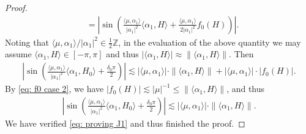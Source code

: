 \documentclass{amsart}
\numberwithin{equation}{section}
\numberwithin{equation}{section}
\begin{document}
\begin{proof}
\begin{align*}
    &=\left|\sin\left(\frac{\langle\mu,\alpha_1\rangle}{|\alpha_1|^2}\langle \alpha_1, H\rangle+ \frac{\langle\mu,\alpha_1\rangle}{2|\alpha_1|^2}f_0(H)\right)\right|.
\end{align*}
Noting that $\langle\mu,\alpha_1\rangle/|\alpha_1|^2\in \frac12\mathbb{Z}$, in the evaluation of the above quantity we may assume 
$\langle \alpha_1, H\rangle\in[-\pi,\pi]$ and thus $|\langle \alpha_1, H\rangle|\approx\|\langle \alpha_1, H\rangle\|$.  
Then 
\begin{align*}
    \left|\sin\left(\frac{\langle\mu,\alpha_1\rangle}{|\alpha_1|^2}\langle \alpha_1, H_{0}\rangle+\frac{\delta_0 \pi}{2}\right)\right|\lesssim 
|\langle\mu,\alpha_1\rangle|\cdot \|\langle \alpha_1, H\rangle\|+ |\langle\mu,\alpha_1\rangle|\cdot |f_0(H)|.
\end{align*}
By \eqref{eq: f0 case 2}, we have $|f_0(H)|\lesssim |\mu|^{-1}\leq \|\langle\alpha_1,H\rangle\|$, and thus 
\begin{align*}
    \left|\sin\left(\frac{\langle\mu,\alpha_1\rangle}{|\alpha_1|^2}\langle \alpha_1, H_{0}\rangle+\frac{\delta_0 \pi}{2}\right)\right|
    \lesssim |\langle\mu,\alpha_1\rangle |\cdot \|\langle\alpha_1,H\rangle\|.
\end{align*}
We have verified \eqref{eq: proving J1} and thus finished the proof.     
\end{proof}
\end{document}
